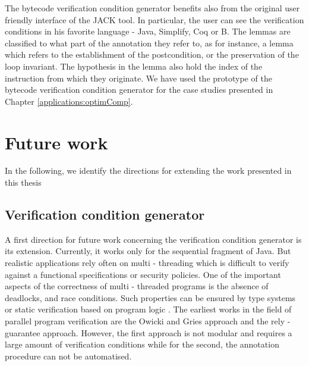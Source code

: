 The bytecode verification condition generator benefits also from the original user friendly interface of the JACK tool.  In particular, 
the user can see the verification conditions in his favorite language - Java, Simplify, Coq or B. The lemmas are classified 
to what part of the annotation they refer to, as for instance, a lemma which refers to the establishment of the postcondition, or the preservation of the loop invariant.
The hypothesis in the lemma also hold the index of the instruction from which they originate. 
We have used the prototype of the bytecode verification condition generator for the case studies presented in Chapter \ref{applications:optimComp}.


\section{Future work}
In the following, we identify the directions for extending the work presented in this thesis

\subsection{ Verification condition generator}
A first direction for future work concerning the verification condition generator is its extension.
Currently, it works only for the sequential fragment of Java. But realistic applications 
rely often on multi - threading which is difficult to verify against a functional specifications or security policies.
One of the important aspects of the correctness of multi - threaded programs is the absence of deadlocks, 
and race conditions. Such properties can be ensured  by type systems \cite{FA99TSL,flanagan00typebased} or static verification based on program logic \cite{FLL02ESC}.  
The earliest works in the field of parallel program  verification are
  the Owicki and Gries approach   
\cite{nipkow99owickigries}  and the rely - guarantee approach. However, 
the first approach is not modular and requires a large amount of verification conditions while for the second, the annotation procedure can not be automatised.

